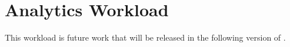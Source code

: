 \chapter{Analytics Workload}
\label{sec:analytics-workload}

This workload is future work that will be released in the following version of \ldbcfinbench.

